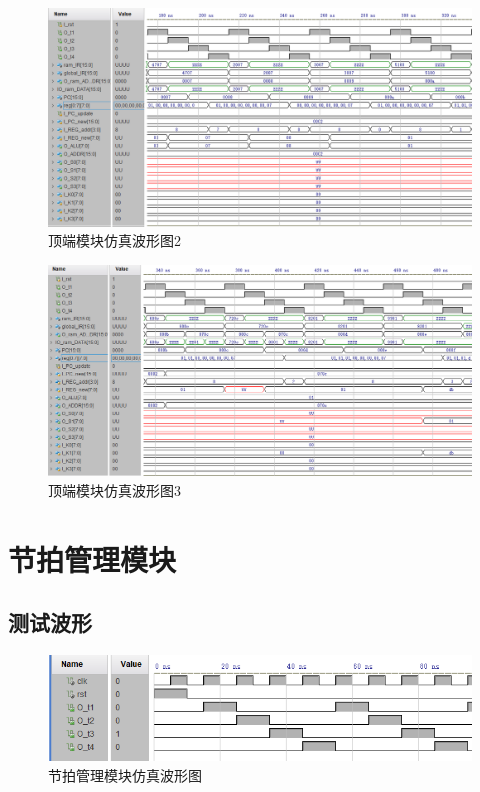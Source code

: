 \documentclass[forprint]{WHUBachelor}
\begin{document}
\begin{figure}[H]
  \centering
  \includegraphics[width=7in]{figures/waveforms/cpu1.png}
  \caption{顶端模块仿真波形图2}
  \label{fig:wave:cpu1}
\end{figure}

\begin{figure}[H]
  \centering
  \includegraphics[width=7in]{figures/waveforms/cpu2.png}
  \caption{顶端模块仿真波形图3}
  \label{fig:wave:cpu2}
\end{figure}
\restoregeometry

\section{节拍管理模块}

\subsection{测试波形}
\begin{figure}[H]
  \centering
  \includegraphics[width=6in]{figures/waveforms/mod4.png}
  \caption{节拍管理模块仿真波形图}
  \label{fig:wave:mod4}
\end{figure}
\end{document}
